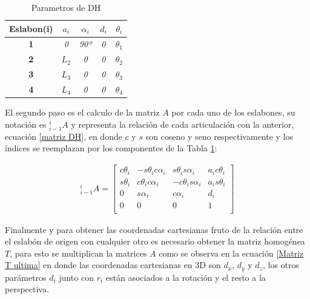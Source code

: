 \documentclass[12pt]{article}
\begin{document}
\begin{table}[]
\centering
\caption{Parametros de DH}
\begin{tabular}{|c|c|c|c|c|}
\hline
\textbf{Eslabon(i)} & \textbf{$a_{i}$} & \textbf{$\alpha_{i}$} & \textbf{$d_{i}$} & \textbf{$\theta_{i}$} \\ \hline
\textbf{1} & \textit{0} & \textit{90º} & \textit{0} & \textit{$\theta_{1}$} \\ \hline
\textbf{2} & \textit{$L_{2}$} & \textit{0} & \textit{0} & \textit{$\theta_{2}$} \\ \hline
\textbf{3} & \textit{$L_{3}$} & \textit{0} & \textit{0} & \textit{$\theta_{3}$} \\ \hline
\textbf{4} & \textit{$L_{4}$} & \textit{0} & \textit{0} & \textit{$\theta_{4}$} \\ \hline
\end{tabular}
\label{tabla1}
\end{table}

El segundo paso es el calculo de la matriz $A$ por cada uno de los eslabones, su notación es $_{i-1}^{i}A$ y representa la relación de cada articulación con la anterior, ecuación \eqref{matriz DH}, en donde $c$ y $s$ son coseno y seno respectivamente y los índices se reemplazan por los componentes de la Tabla \ref{tabla1}:

\begin{gather}
    _{i-1}^{i}A
    =
    \begin{bmatrix}
        c\theta_{i} & -s\theta_{i}c\alpha_{i}	& s\theta_{i}s\alpha_{i}	& a_{i}c\theta_{i}  \\
        s\theta_{i} & c\theta_{i}c\alpha_{i} 	& -c\theta_{i}s\alpha_{i}	& a_{i}s\theta_{i}  \\
        0           & s\alpha_{i} 				& c\alpha_{i} 				& d_{i} \\
        0           & 0 & 0 & 1 \\
    \end{bmatrix}
    \label{matriz DH}
\end{gather}

Finalmente y para obtener las coordenadas cartesianas fruto de la relación entre el eslabón de origen con cualquier otro es necesario obtener la matriz homogénea $T$, para esto se multiplican la matrices $A$ como se observa en la ecuación \eqref{Matriz T ultima} en donde las coordenadas cartesianas en 3D son $d_{x}$, $d_{y}$ y $d_{z}$, los otros parámetros $d_{i}$ junto con $r_{i}$ están asociados a la rotación y el resto a la perspectiva.
\end{document}
